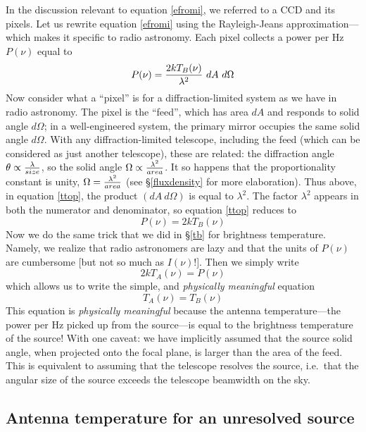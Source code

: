 \documentclass[12pt,psfig,preprint]{aastex}
\begin{document}
	In the discussion relevant to equation \ref{efromi}, we referred
to a CCD and its pixels. Let us rewrite equation \ref{efromi} using the
Rayleigh-Jeans approximation---which makes it specific to radio
astronomy. Each pixel collects a power per Hz $P(\nu)$ equal to
%
\begin{equation} \label{ttop}
P(\nu) =  {2 k T_B(\nu) \over \lambda^2} ~ dA ~ d\Omega
\end{equation}
%
	Now consider what a ``pixel'' is for a diffraction-limited
system as we have in radio astronomy. The pixel is the ``feed'', which
has area $dA$ and responds to solid angle $d \Omega$; in a
well-engineered system, the primary mirror occupies the same solid angle
$d \Omega$. With any diffraction-limited telescope, including the feed
(which can be considered as just another telescope), these are related:
the diffraction angle $\theta \propto {\lambda \over size}$, so the
solid angle $\Omega \propto  { \lambda^2 \over area} $.
It so happens that the proportionality constant is unity, $\Omega
=  { \lambda^2 \over area} $ (see \S \ref{fluxdensity} for more
elaboration). Thus above, in equation \ref{ttop}, the product $(dA ~
d\Omega)$ is equal to $\lambda^2$. The factor $\lambda^2$ appears in
both the numerator and denominator, so equation \ref{ttop} reduces to
%
\begin{equation} \label{pwrnu}
P(\nu) = 2kT_B(\nu)
\end{equation}
%
	Now we do the same trick that we did in \S \ref{tb} for
brightness temperature. Namely, we realize that radio astronomers are
lazy and that the units of $P(\nu)$ are cumbersome [but not so much as
$I(\nu)$!]. Then we simply write
%
\begin{equation}
2kT_A(\nu) = P(\nu)
\end{equation}
%
\noindent which allows us to write the simple, and {\it physically
meaningful} equation
%
\begin{equation}
T_A(\nu) = T_B(\nu)
\end{equation}
%
	This equation is {\it physically meaningful} because the antenna
temperature---the power per Hz picked up from the source---is equal to
the brightness temperature of the source! With one caveat: we have
implicitly assumed that the source solid angle, when projected onto the
focal plane, is larger than the area of the feed. This is equivalent to
assuming that the telescope resolves the source, i.e.\ that the angular
size of the source exceeds the telescope beamwidth on the sky.

\subsection{Antenna temperature for an unresolved source}
\end{document}
